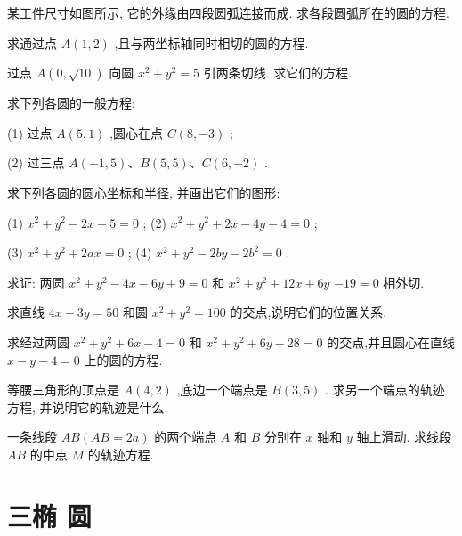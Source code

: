 \documentclass[lang=cn,newtx,10pt,scheme=chinese]{elegantbook}
\begin{document}
\begin{problemset}[习 题 五]
\item 某工件尺寸如图所示, 它的外缘由四段圆弧连接而成. 求各段圆弧所在的圆的方程.

\item 求通过点 \(A\left( {1,2}\right)\) ,且与两坐标轴同时相切的圆的方程.

\item 过点 \(A\left( {0,\sqrt{10}}\right)\) 向圆 \({x}^{2} + {y}^{2} = 5\) 引两条切线. 求它们的方程.

\item 求下列各圆的一般方程:

(1) 过点 \(A\left( {5,1}\right)\) ,圆心在点 \(C\left( {8, - 3}\right)\) ;

(2) 过三点 \(A\left( {-1,5}\right) \text{、}B\left( {5,5}\right) \text{、}C\left( {6, - 2}\right)\) .

\item 求下列各圆的圆心坐标和半径, 并画出它们的图形:

(1) \({x}^{2} + {y}^{2} - {2x} - 5 = 0\) ; (2) \({x}^{2} + {y}^{2} + {2x} - {4y} - 4 = 0\) ;

(3) \({x}^{2} + {y}^{2} + {2ax} = 0\) ; (4) \({x}^{2} + {y}^{2} - {2by} - 2{b}^{2} = 0\) .

\item 求证: 两圆 \({x}^{2} + {y}^{2} - {4x} - {6y} + 9 = 0\) 和 \({x}^{2} + {y}^{2} + {12x} + {6y}\) \(- {19} = 0\) 相外切.

\item 求直线 \({4x} - {3y} = {50}\) 和圆 \({x}^{2} + {y}^{2} = {100}\) 的交点,说明它们的位置关系.

\item 求经过两圆 \({x}^{2} + {y}^{2} + {6x} - 4 = 0\) 和 \({x}^{2} + {y}^{2} + {6y} - {28} = 0\) 的交点,并且圆心在直线 \(x - y - 4 = 0\) 上的圆的方程.

\item 等腰三角形的顶点是 \(A\left( {4,2}\right)\) ,底边一个端点是 \(B\left( {3,5}\right)\) . 求另一个端点的轨迹方程, 并说明它的轨迹是什么.

\item 一条线段 \({AB}\left( {{AB} = {2a}}\right)\) 的两个端点 \(A\) 和 \(B\) 分别在 \(x\) 轴和 \(y\) 轴上滑动. 求线段 \({AB}\) 的中点 \(M\) 的轨迹方程.
\end{problemset}

\section*{三\text{ }椭 圆}
\end{document}
